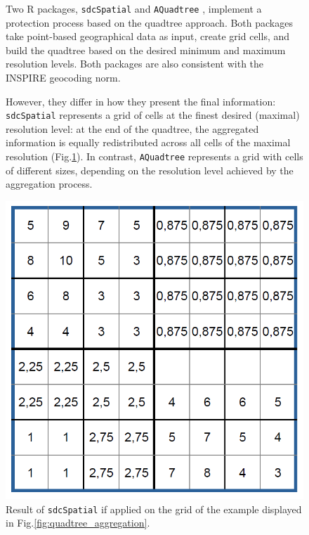 \begin{figure}[H]
\begin{minipage}{0.48\linewidth}
Two R packages, \texttt{sdcSpatial} \citep{sdcSpatial_2022} and \texttt{AQuadtree} \citep{AQuadtree_2023}, implement a protection process based on the quadtree approach. Both packages take point-based geographical data as input, create grid cells, and build the quadtree based on the desired minimum and maximum resolution levels. Both packages are also consistent with the INSPIRE geocoding norm. \bigskip

However, they differ in how they present the final information: \texttt{sdcSpatial} represents a grid of cells at the finest desired (maximal) resolution level: at the end of the quadtree, the aggregated information is equally redistributed across all cells of the maximal resolution (Fig.\ref{fig:quadtree_sdcspatial_result}). In contrast, \texttt{AQuadtree} represents a grid with cells of different sizes, depending on the resolution level achieved by the aggregation process.
\end{minipage}
\hfill
\begin{minipage}{0.48\linewidth}
    \includegraphics[width=\linewidth]{figures/Quadtree/adaptation_example_variante_sdcspatial_fix.png}
    \caption{Result of \texttt{sdcSpatial} if applied on the grid of the example displayed in Fig.\ref{fig:quadtree_aggregation}.}
    \label{fig:quadtree_sdcspatial_result}
\end{minipage}
\end{figure}





